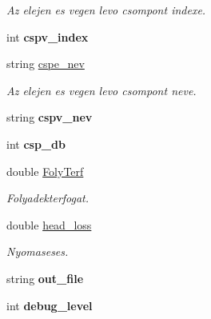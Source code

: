 \begin{DoxyCompactItemize}
\begin{DoxyCompactList}\small\item\em Az elejen es vegen levo csompont indexe. \end{DoxyCompactList}\item 
\hypertarget{class_agelem_a58103d621323b8cc243fa8e7e3afd15d}{}\label{class_agelem_a58103d621323b8cc243fa8e7e3afd15d} 
int {\bfseries cspv\+\_\+index}
\item 
\hypertarget{class_agelem_aba3d9c5d2eed320e7a0531e99188a73a}{}\label{class_agelem_aba3d9c5d2eed320e7a0531e99188a73a} 
string \hyperlink{class_agelem_aba3d9c5d2eed320e7a0531e99188a73a}{cspe\+\_\+nev}
\begin{DoxyCompactList}\small\item\em Az elejen es vegen levo csompont neve. \end{DoxyCompactList}\item 
\hypertarget{class_agelem_ac637696905966c41ddc21c708c653991}{}\label{class_agelem_ac637696905966c41ddc21c708c653991} 
string {\bfseries cspv\+\_\+nev}
\item 
\hypertarget{class_agelem_a2cf9ad5c8991d7bfc41754126a1a82f6}{}\label{class_agelem_a2cf9ad5c8991d7bfc41754126a1a82f6} 
int {\bfseries csp\+\_\+db}
\item 
\hypertarget{class_agelem_ab235bccddd3f04b9f4e991ee8f3dd8ff}{}\label{class_agelem_ab235bccddd3f04b9f4e991ee8f3dd8ff} 
double \hyperlink{class_agelem_ab235bccddd3f04b9f4e991ee8f3dd8ff}{Foly\+Terf}
\begin{DoxyCompactList}\small\item\em Folyadekterfogat. \end{DoxyCompactList}\item 
\hypertarget{class_agelem_a723a132d3fc5ce069b16f22d169d9772}{}\label{class_agelem_a723a132d3fc5ce069b16f22d169d9772} 
double \hyperlink{class_agelem_a723a132d3fc5ce069b16f22d169d9772}{head\+\_\+loss}
\begin{DoxyCompactList}\small\item\em Nyomaseses. \end{DoxyCompactList}\item 
\hypertarget{class_agelem_a79b5d0684f173c6cbd98530583352211}{}\label{class_agelem_a79b5d0684f173c6cbd98530583352211} 
string {\bfseries out\+\_\+file}
\item 
\hypertarget{class_agelem_a18e84a58b3a1f45465e27e1afdf2f2a1}{}\label{class_agelem_a18e84a58b3a1f45465e27e1afdf2f2a1} 
int {\bfseries debug\+\_\+level}
\item 
\hypertarget{class_agelem_a09ea41e75493961eb2b1d755c74e95f6}{}\label{class_agelem_a09ea41e75493961eb2b1d755c74e95f6} 

\end{DoxyCompactItemize}
